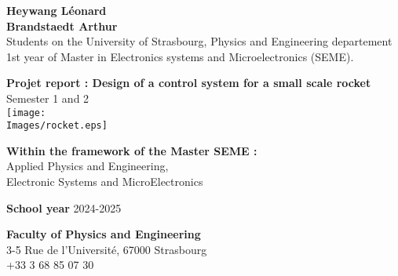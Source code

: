 \begin{titlepage}
    \raggedright
    \textbf{Heywang Léonard}	\\
    \textbf{Brandstaedt Arthur}  \\
    Students on the University of Strasbourg, Physics and Engineering departement\\
    1st year of Master in Electronics systems and Microelectronics (SEME).

    \raggedleft

    \centering
    \vspace{1cm}

    \huge
    \textbf{Projet report : Design of a control system for a small scale rocket}\\
    Semester 1 and 2\\
    \vspace{0.5cm}
    \texttt{[image: \\Images/rocket.eps]}

    \raggedright
    \normalsize
    \vspace{1cm}
    \textbf{Within the framework of the Master SEME :}\\
    Applied Physics and Engineering, \\
    Electronic Systems and MicroElectronics

    \vspace{1cm}
    \textbf{School year} 2024-2025

    \vspace{1cm}
    \textbf{Faculty of Physics and Engineering}\\
    3-5 Rue de l'Université, 67000 Strasbourg\\
    +33 3 68 85 07 30

    \vspace{1 cm}
    \centering
    \begin{figure}[!ht]%
        \centering
        \qquad
    \end{figure}
\end{titlepage}
